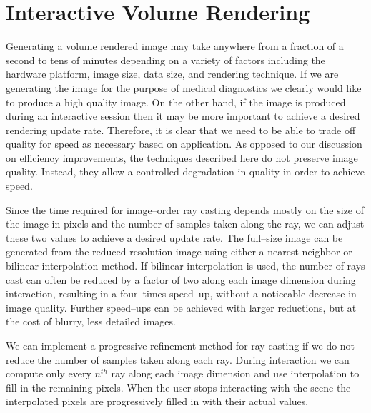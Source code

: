 \section{Interactive Volume Rendering}

Generating a volume rendered image may take anywhere from a fraction of a second to tens of minutes depending on a variety of factors including the hardware platform, image size, data size, and rendering technique. If we are generating the image for the purpose of medical diagnostics we clearly would like to produce a high quality image. On the other hand, if the image is produced during an interactive session then it may be more important to achieve a desired rendering update rate. Therefore, it is clear that we need to be able to trade off quality for speed as necessary based on application. As opposed to our discussion on efficiency improvements, the techniques described here do not preserve image quality. Instead, they allow a controlled degradation in quality in order to achieve speed.

Since the time required for image--order ray casting depends mostly on the size of the image in pixels and the number of samples taken along the ray, we can adjust these two values to achieve a desired update rate. The full--size image can be generated from the reduced resolution image using either a nearest neighbor or bilinear interpolation method. If bilinear interpolation is used, the number of rays cast can often be reduced by a factor of two along each image dimension during interaction, resulting in a four--times speed--up, without a noticeable decrease in image quality. Further speed--ups can be achieved with larger reductions, but at the cost of blurry, less detailed images.

We can implement a progressive refinement method for ray casting if we do not reduce the number of samples taken along each ray. During interaction we can compute only every $n^{th}$ ray along each image dimension and use interpolation to fill in the remaining pixels. When the user stops interacting with the scene the interpolated pixels are progressively filled in with their actual values.

